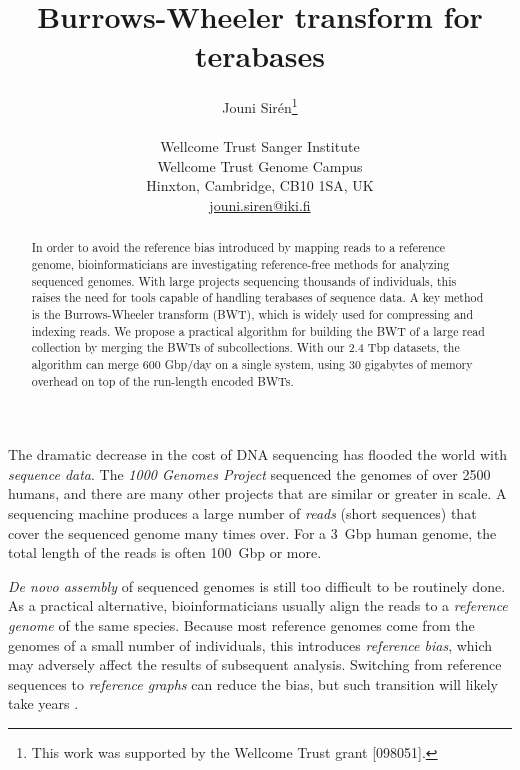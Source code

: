 \documentclass[smallabstract,smallcaptions]{dccpaper}
\begin{document}
\title
{\large
\textbf{Burrows-Wheeler transform for terabases}
}


\author{%
Jouni Sirén\thanks{This work was supported by the Wellcome Trust grant [098051].} \\[0.5em]
{\small\begin{minipage}{\linewidth}\begin{center}
\begin{tabular}{c}
Wellcome Trust Sanger Institute \\
Wellcome Trust Genome Campus \\
Hinxton, Cambridge, CB10 1SA, UK \\
\url{jouni.siren@iki.fi}
\end{tabular}
\end{center}\end{minipage}}
}


\maketitle
\thispagestyle{empty}


\begin{abstract}
In order to avoid the reference bias introduced by mapping reads to a reference genome, bioinformaticians are investigating reference-free methods for analyzing sequenced genomes. With large projects sequencing thousands of individuals, this raises the need for tools capable of handling terabases of sequence data. A key method is the Burrows-Wheeler transform (BWT), which is widely used for compressing and indexing reads. We propose a practical algorithm for building the BWT of a large read collection by merging the BWTs of subcollections. With our 2.4 Tbp datasets, the algorithm can merge 600 Gbp/day on a single system, using 30 gigabytes of memory overhead on top of the run-length encoded BWTs.
\end{abstract}



The dramatic decrease in the cost of DNA sequencing has flooded the world with \emph{sequence data}. The \emph{1000 Genomes Project} \cite{1000GP2015} sequenced the genomes of over 2500 humans, and there are many other projects that are similar or greater in scale. A sequencing machine produces a large number of \emph{reads} (short sequences) that cover the sequenced genome many times over. For a 3~Gbp human genome, the total length of the reads is often 100~Gbp or more.

\emph{De novo assembly} of sequenced genomes is still too difficult to be routinely done. As a practical alternative, bioinformaticians usually align the reads to a \emph{reference genome} of the same species. Because most reference genomes come from the genomes of a small number of individuals, this introduces \emph{reference bias}, which may adversely affect the results of subsequent analysis. Switching from reference sequences to \emph{reference graphs} can reduce the bias, but such transition will likely take years \cite{Church2015}.
\end{document}
